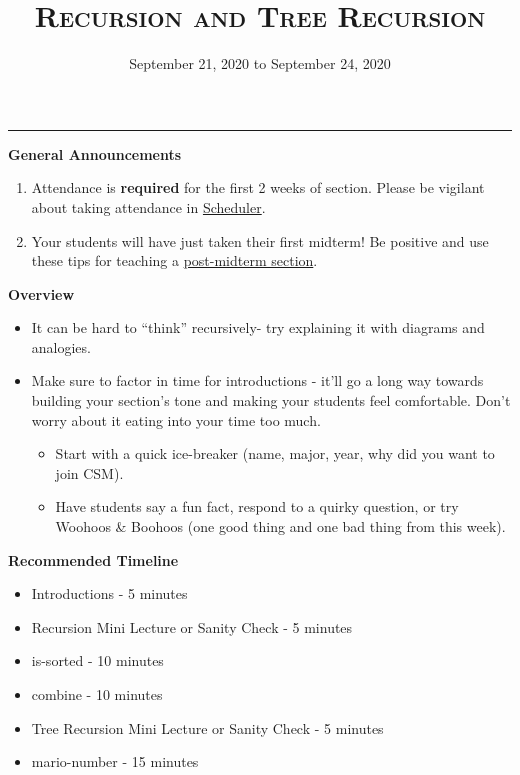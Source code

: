 \documentclass{exam}
\title{\textsc{Recursion and Tree Recursion}}
\date{September 21, 2020 to September 24, 2020}
\begin{document}
\maketitle
\rule{\textwidth}{0.15em}
\fontsize{12}{15}\selectfont

\begin{guide}
\textbf{General Announcements}
\begin{enumerate}
    \item Attendance is \textbf{required} for the first 2 weeks of section. Please be vigilant about taking attendance in \href{scheduler.csmentors.org}{Scheduler}.
    \item Your students will have just taken their first midterm! Be positive and use these tips for teaching a \href{https://docs.google.com/document/d/1Oj0Cmm_HKPOU3YsdBWu1VDF2O1nLYBO_VWaczuGMc8g/edit}{post-midterm section}.
\end{enumerate}
\end{guide}

\begin{guide}
\textbf{Overview}
\begin{itemize}
    \item It can be hard to ``think'' recursively- try explaining it with diagrams and analogies.
    \item Make sure to factor in time for introductions - it’ll go a long way towards building your section’s tone and making your students feel comfortable. Don’t worry about it eating into your time too much.
    \begin{itemize}
        \item Start with a quick ice-breaker (name, major, year, why did you want to join CSM).
        \item Have students say a fun fact, respond to a quirky question, or try Woohoos \& Boohoos (one good thing and one bad thing from this week).
    \end{itemize}
\end{itemize}
\end{guide}

\begin{guide}
\textbf{Recommended Timeline}
\begin{itemize}
    \item Introductions - 5 minutes
    \item Recursion Mini Lecture or Sanity Check - 5 minutes
    \item is-sorted - 10 minutes
    \item combine - 10 minutes
    \item Tree Recursion Mini Lecture or Sanity Check - 5 minutes
    \item mario-number - 15 minutes
\end{itemize}
\end{guide}
\end{document}
